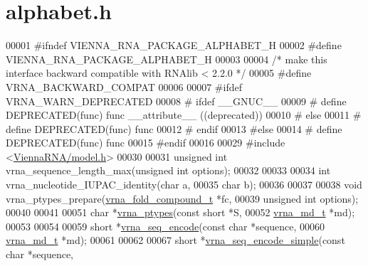 \hypertarget{alphabet_8h_source}{}\section{alphabet.\+h}
\label{alphabet_8h_source}

\begin{DoxyCode}
00001 \textcolor{preprocessor}{#ifndef VIENNA\_RNA\_PACKAGE\_ALPHABET\_H}
00002 \textcolor{preprocessor}{#define VIENNA\_RNA\_PACKAGE\_ALPHABET\_H}
00003 
00004 \textcolor{comment}{/* make this interface backward compatible with RNAlib < 2.2.0 */}
00005 \textcolor{preprocessor}{#define VRNA\_BACKWARD\_COMPAT}
00006 
00007 \textcolor{preprocessor}{#ifdef VRNA\_WARN\_DEPRECATED}
00008 \textcolor{preprocessor}{# ifdef \_\_GNUC\_\_}
00009 \textcolor{preprocessor}{#  define DEPRECATED(func) func \_\_attribute\_\_ ((deprecated))}
00010 \textcolor{preprocessor}{# else}
00011 \textcolor{preprocessor}{#  define DEPRECATED(func) func}
00012 \textcolor{preprocessor}{# endif}
00013 \textcolor{preprocessor}{#else}
00014 \textcolor{preprocessor}{# define DEPRECATED(func) func}
00015 \textcolor{preprocessor}{#endif}
00016 
00029 \textcolor{preprocessor}{#include <\hyperlink{model_8h}{ViennaRNA/model.h}>}
00030 
00031 \textcolor{keywordtype}{unsigned} \textcolor{keywordtype}{int} vrna\_sequence\_length\_max(\textcolor{keywordtype}{unsigned} \textcolor{keywordtype}{int} options);
00032 
00033 
00034 \textcolor{keywordtype}{int} vrna\_nucleotide\_IUPAC\_identity(\textcolor{keywordtype}{char} a,
00035                                    \textcolor{keywordtype}{char} b);
00036 
00037 
00038 \textcolor{keywordtype}{void} vrna\_ptypes\_prepare(\hyperlink{group__fold__compound_structvrna__fc__s}{vrna\_fold\_compound\_t} *fc,
00039                          \textcolor{keywordtype}{unsigned} \textcolor{keywordtype}{int}         options);
00040 
00041 
00051 \textcolor{keywordtype}{char} *\hyperlink{group__utils_ga51a9e86a5f731f5f2f5584ee67cee4a8}{vrna\_ptypes}(\textcolor{keyword}{const} \textcolor{keywordtype}{short} *S,
00052                   \hyperlink{group__model__details_structvrna__md__s}{vrna\_md\_t}   *md);
00053 
00054 
00059 \textcolor{keywordtype}{short} *\hyperlink{group__utils_ga636e7d6f888fd639587296a5eddea660}{vrna\_seq\_encode}(\textcolor{keyword}{const} \textcolor{keywordtype}{char} *sequence,
00060                        \hyperlink{group__model__details_structvrna__md__s}{vrna\_md\_t}  *md);
00061 
00062 
00067 \textcolor{keywordtype}{short} *\hyperlink{group__utils_ga3cd79d21d53248ad2634c1c0d43e97d7}{vrna\_seq\_encode\_simple}(\textcolor{keyword}{const} \textcolor{keywordtype}{char}  *sequence,

\end{DoxyCode}
